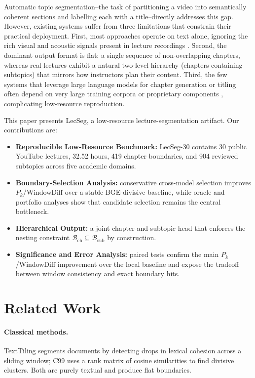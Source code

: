 \documentclass[conference]{IEEEtran}
\newcommand{\lecseg}{LecSeg}
\newcommand{\dataset}{LecSeg-30}
\begin{document}
Automatic topic segmentation--the task of partitioning a video into semantically
coherent sections and labelling each with a title--directly addresses this gap.
However, existing systems suffer from three limitations that constrain their
practical deployment. First, most approaches operate on text alone, ignoring
the rich visual and acoustic signals present in lecture recordings
\cite{hearst1997_texttiling,choi2000_c99}. Second, the dominant output format is flat: a single
sequence of non-overlapping chapters, whereas real lectures exhibit a natural
two-level hierarchy (chapters containing subtopics) that mirrors how instructors
plan their content. Third, the few systems that leverage large language models
for chapter generation or titling often depend on very large training corpora or
proprietary components \cite{cao2022_chaptergen,ventura2025_chapterllama},
complicating low-resource reproduction.

This paper presents \lecseg{}, a low-resource lecture-segmentation artifact.
Our contributions are:
\begin{itemize}
  \item \textbf{Reproducible Low-Resource Benchmark:} \dataset{} contains 30
    public YouTube lectures, 32.52 hours, 419 chapter boundaries, and 904
    reviewed subtopics across five academic domains.
  \item \textbf{Boundary-Selection Analysis:} conservative cross-model
    selection improves $P_k$/WindowDiff over a stable BGE-divisive baseline,
    while oracle and portfolio analyses show that candidate selection remains
    the central bottleneck.
  \item \textbf{Hierarchical Output:} a joint chapter-and-subtopic head that
    enforces the nesting constraint $\mathcal{B}_\text{ch} \subseteq
    \mathcal{B}_\text{sub}$ by construction.
  \item \textbf{Significance and Error Analysis:} paired tests confirm the
    main $P_k$/WindowDiff improvement over the local baseline and expose the
    tradeoff between window consistency and exact boundary hits.
\end{itemize}

\section{Related Work}

\paragraph{Classical methods.}
TextTiling \cite{hearst1997_texttiling} segments documents by detecting drops in
lexical cohesion across a sliding window; C99 \cite{choi2000_c99} uses a rank matrix
of cosine similarities to find divisive clusters. Both are purely textual
and produce flat boundaries.
\end{document}
